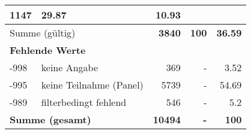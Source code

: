 \begin{longtable}{lXrrr}
       \num{1147} &
       \num[round-mode=places,round-precision=2]{29,87} &
         \num[round-mode=places,round-precision=2]{10,93} \\
     \midrule
     \multicolumn{2}{l}{Summe (gültig)} &
       \textbf{\num{3840}} &
     \textbf{100} &
       \textbf{\num[round-mode=places,round-precision=2]{36,59}} \\
     \multicolumn{5}{l}{\textbf{Fehlende Werte}}\\
       -998 &
       keine Angabe &
         \num{369} &
        - &
         \num[round-mode=places,round-precision=2]{3,52} \\
       -995 &
       keine Teilnahme (Panel) &
         \num{5739} &
        - &
         \num[round-mode=places,round-precision=2]{54,69} \\
       -989 &
       filterbedingt fehlend &
         \num{546} &
        - &
         \num[round-mode=places,round-precision=2]{5,2} \\
     \midrule
     \multicolumn{2}{l}{\textbf{Summe (gesamt)}} &
          \textbf{\num{10494}} &
        \textbf{-} &
        \textbf{100} \\
     \bottomrule
     \end{longtable}
     
